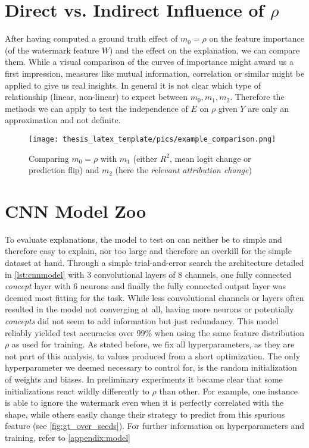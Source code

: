 \section{Direct vs. Indirect Influence of $\rho$}
After having computed a ground truth effect of $m_0 = \rho$ on the feature importance (of the watermark feature $W$) and the effect on the explanation, we can compare them.
While a visual comparison of the curves of importance might award us a first impression, measures like mutual information, correlation or similar might be applied to give us real insights. 
In general it is not clear which type of relationship (linear, non-linear) to expect between $m_0, m_1, m_2$. Therefore the methods we can apply to test the independence of $E$ on $\rho$ given $Y$ are only an approximation and not definite.

\begin{figure}
    \centering
    \texttt{[image: thesis\_latex\_template/pics/example\_comparison.png]}
    \caption{Comparing $m_0 = \rho$ with $m_1$ (either $R^2$, mean logit change or prediction flip) and $m_2$ (here the \textit{relevant attribution change}) }
    \label{fig:enter-label}
\end{figure}

\section{CNN Model Zoo}\label{section:training}
To evaluate explanations, the model to test on can neither be to simple and therefore easy to explain, nor too large and therefore an overkill for the simple dataset at hand.
Through a simple trial-and-error search the architecture detailed in \autoref{lst:cnnmodel} with 3 convolutional layers of 8 channels, one fully connected \textit{concept} layer with 6 neurons and finally the fully connected output layer was deemed most fitting for the task. While less convolutional channels or layers often resulted in the model not converging at all, having more neurons or potentially \textit{concepts} did not seem to add information but just redundancy.
This model reliably yielded test accuracies over 99\% when using the same feature distribution $\rho$ as used for training. As stated before, we fix all hyperparameters, as they are not part of this analysis, to values produced from a short optimization.
The only hyperparameter we deemed necessary to control for, is the random initialization of weights and biases. In preliminary experiments it became clear that some initializations react wildly differently to $\rho$ than other. For example, one instance is able to ignore the watermark even when it is perfectly correlated with the shape, while others easily change their strategy to predict from this spurious feature (see \cref{fig:gt_over_seeds}).  
For further information on hyperparameters and training, refer to \cref{appendix:model}

